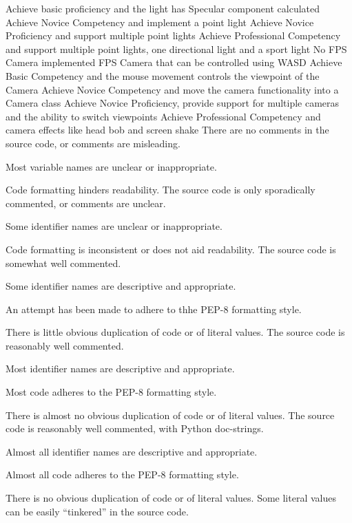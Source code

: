 \documentclass{../../fal_assignment}
\begin{document}
\begin{markingrubric}
		\grade Achieve basic proficiency and the light has Specular component calculated
		\grade Achieve Novice Competency and implement a point light
		\grade Achieve Novice Proficiency and support multiple point lights
		\grade Achieve Professional Competency and support multiple point lights, one directional light and a sport light
		\grade\fail No FPS Camera implemented
		\grade FPS Camera that can be controlled using WASD
		\grade Achieve Basic Competency and the mouse movement controls the viewpoint of the Camera
		\grade Achieve Novice Competency and move the camera functionality into a Camera class
		\grade Achieve Novice Proficiency, provide support for multiple cameras and the ability to switch viewpoints
		\grade Achieve Professional Competency and camera effects like head bob and screen shake
\grade\fail There are no comments in the source code, or comments are misleading.
\par Most variable names are unclear or inappropriate.
\par Code formatting hinders readability.
\grade The source code is only sporadically commented, or comments are unclear.
\par Some identifier names are unclear or inappropriate.
\par Code formatting is inconsistent or does not aid readability.
\grade The source code is somewhat well commented.
\par Some identifier names are descriptive and appropriate.
\par An attempt has been made to adhere to thhe PEP-8 formatting style.
\par There is little obvious duplication of code or of literal values.           
\grade The source code is reasonably well commented.
\par Most identifier names are descriptive and appropriate.
\par Most code adheres to the PEP-8 formatting style.
\par There is almost no obvious duplication of code or of literal values.   
\grade The source code is reasonably well commented, with Python doc-strings.
\par Almost all identifier names are descriptive and appropriate.
\par Almost all code adheres to the PEP-8 formatting style.
\par There is no obvious duplication of code or of literal values. Some literal values can be easily ``tinkered'' in the source code. 

\end{markingrubric}
\end{document}
